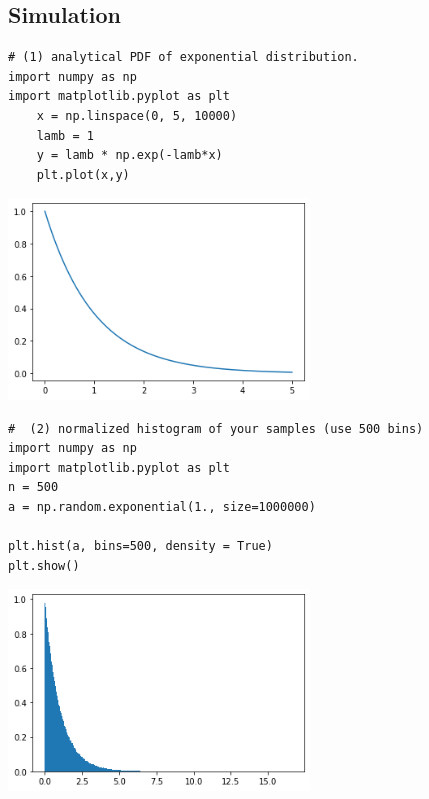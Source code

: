 \documentclass{article}
\begin{document}
\subsection{Simulation}
\begin{lstlisting}
# (1) analytical PDF of exponential distribution.
import numpy as np
import matplotlib.pyplot as plt
    x = np.linspace(0, 5, 10000)
    lamb = 1
    y = lamb * np.exp(-lamb*x)
    plt.plot(x,y)
\end{lstlisting}
\begin{center}
    \includegraphics[width=0.6\textwidth]{images/2_3_analy.png}
\end{center}
\begin{lstlisting}
#  (2) normalized histogram of your samples (use 500 bins)
import numpy as np
import matplotlib.pyplot as plt
n = 500
a = np.random.exponential(1., size=1000000)

plt.hist(a, bins=500, density = True)
plt.show()
\end{lstlisting}
\begin{center}
    \includegraphics[width=0.6\textwidth]{images/2_3_revised.png}
\end{center}

\end{document}
